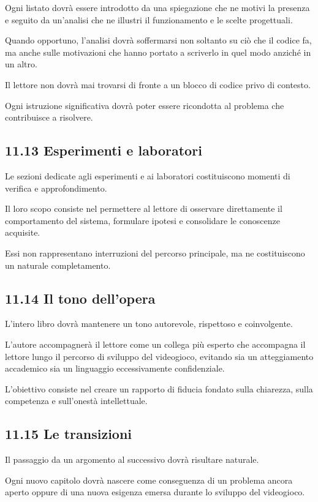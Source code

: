 \documentclass{article}
\begin{document}
Ogni listato dovrà essere introdotto da una spiegazione che ne motivi la presenza e seguito da un'analisi che ne
illustri il funzionamento e le scelte progettuali.

Quando opportuno, l'analisi dovrà soffermarsi non soltanto su ciò che il codice fa, ma anche sulle motivazioni che hanno
portato a scriverlo in quel modo anziché in un altro.

Il lettore non dovrà mai trovarsi di fronte a un blocco di codice privo di contesto.

Ogni istruzione significativa dovrà poter essere ricondotta al problema che contribuisce a risolvere.

\subsection{11.13 Esperimenti e laboratori}
Le sezioni dedicate agli esperimenti e ai laboratori costituiscono momenti di verifica e approfondimento.

Il loro scopo consiste nel permettere al lettore di osservare direttamente il comportamento del sistema, formulare
ipotesi e consolidare le conoscenze acquisite.

Essi non rappresentano interruzioni del percorso principale, ma ne costituiscono un naturale completamento.

\subsection[11.14 Il tono dell{}'opera]{11.14 Il tono dell'opera}
L'intero libro dovrà mantenere un tono autorevole, rispettoso e coinvolgente.

L'autore accompagnerà il lettore come un collega più esperto che accompagna il lettore lungo il percorso di sviluppo del
videogioco, evitando sia un atteggiamento accademico sia un linguaggio eccessivamente confidenziale.

L'obiettivo consiste nel creare un rapporto di fiducia fondato sulla chiarezza, sulla competenza e sull'onestà
intellettuale.

\subsection{11.15 Le transizioni}
Il passaggio da un argomento al successivo dovrà risultare naturale.

Ogni nuovo capitolo dovrà nascere come conseguenza di un problema ancora aperto oppure di una nuova esigenza emersa
durante lo sviluppo del videogioco.
\end{document}
